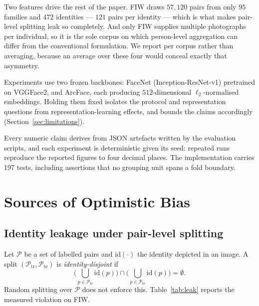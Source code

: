 \documentclass[journal,12pt]{IEEEtran}
\begin{document}
Two features drive the rest of the paper. FIW draws $57{,}120$ pairs from only
$95$ families and $472$ identities --- $121$ pairs per identity --- which is
what makes pair-level splitting leak so completely. And only FIW supplies
multiple photographs per individual, so it is the sole corpus on which
person-level aggregation can differ from the conventional formulation. We
report per corpus rather than averaging, because an average over these four
would conceal exactly that asymmetry.

Experiments use two frozen backbones: FaceNet (Inception-ResNet-v1)\cite{schroff2015facenet}
pretrained on VGGFace2, and ArcFace, each producing $512$-dimensional $\ell_2$-normalised
embeddings. Holding them fixed isolates the protocol and representation questions
from representation-learning effects, and bounds the claims accordingly
(Section~\ref{sec:limitations}).

Every numeric claim derives from JSON artefacts written by the evaluation
scripts, and each experiment is deterministic given its seed: repeated runs
reproduce the reported figures to four decimal places. The implementation
carries 197 tests, including assertions that no grouping unit spans a fold
boundary.

\section{Sources of Optimistic Bias}
\label{sec:bias}

\subsection{Identity leakage under pair-level splitting}

Let $\mathcal{P}$ be a set of labelled pairs and $\mathrm{id}(\cdot)$ the
identity depicted in an image. A split $(\mathcal{P}_{\text{tr}},
\mathcal{P}_{\text{te}})$ is \emph{identity-disjoint} if
\begin{equation}
\Big(\bigcup_{p \in \mathcal{P}_{\text{tr}}} \mathrm{id}(p)\Big) \cap
\Big(\bigcup_{p \in \mathcal{P}_{\text{te}}} \mathrm{id}(p)\Big) = \emptyset .
\end{equation}
Random splitting over $\mathcal{P}$ does not enforce this. Table~\ref{tab:leak}
reports the measured violation on FIW.
\end{document}
